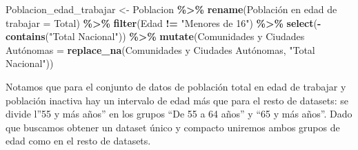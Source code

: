 \documentclass[notspecified,article,submit,moreauthors,pdftex]{Definitions/mdpi}
\newenvironment{Shaded}{\begin{snugshade}}{\end{snugshade}}
\newcommand{\AttributeTok}[1]{\textcolor[rgb]{0.13,0.29,0.53}{#1}}
\newcommand{\FunctionTok}[1]{\textcolor[rgb]{0.13,0.29,0.53}{\textbf{#1}}}
\newcommand{\NormalTok}[1]{#1}
\newcommand{\OtherTok}[1]{\textcolor[rgb]{0.56,0.35,0.01}{#1}}
\newcommand{\SpecialCharTok}[1]{\textcolor[rgb]{0.81,0.36,0.00}{\textbf{#1}}}
\newcommand{\StringTok}[1]{\textcolor[rgb]{0.31,0.60,0.02}{#1}}
\begin{document}
\begin{Shaded}
\begin{Highlighting}[]
\NormalTok{Poblacion\_edad\_trabajar }\OtherTok{\textless{}{-}}\NormalTok{ Poblacion }\SpecialCharTok{\%\textgreater{}\%}
  \FunctionTok{rename}\NormalTok{(}\StringTok{\textasciigrave{}}\AttributeTok{Población en edad de trabajar}\StringTok{\textasciigrave{}} \OtherTok{=} \StringTok{\textasciigrave{}}\AttributeTok{Total}\StringTok{\textasciigrave{}}\NormalTok{) }\SpecialCharTok{\%\textgreater{}\%}
  \FunctionTok{filter}\NormalTok{(Edad }\SpecialCharTok{!=} \StringTok{"Menores de 16"}\NormalTok{) }\SpecialCharTok{\%\textgreater{}\%}
  \FunctionTok{select}\NormalTok{(}\SpecialCharTok{{-}}\FunctionTok{contains}\NormalTok{(}\StringTok{"Total Nacional"}\NormalTok{)) }\SpecialCharTok{\%\textgreater{}\%}
  \FunctionTok{mutate}\NormalTok{(}\StringTok{\textasciigrave{}}\AttributeTok{Comunidades y Ciudades Autónomas}\StringTok{\textasciigrave{}} \OtherTok{=}
           \FunctionTok{replace\_na}\NormalTok{(}\StringTok{\textasciigrave{}}\AttributeTok{Comunidades y Ciudades Autónomas}\StringTok{\textasciigrave{}}\NormalTok{, }\StringTok{"Total Nacional"}\NormalTok{))}
\end{Highlighting}
\end{Shaded}

Notamos que para el conjunto de datos de población total en edad de
trabajar y población inactiva hay un intervalo de edad más que para el
resto de datasets: se divide l''55 y más años'' en los grupos ``De 55 a
64 años'' y ``65 y más años''. Dado que buscamos obtener un dataset
único y compacto uniremos ambos grupos de edad como en el resto de
datasets.
\end{document}
